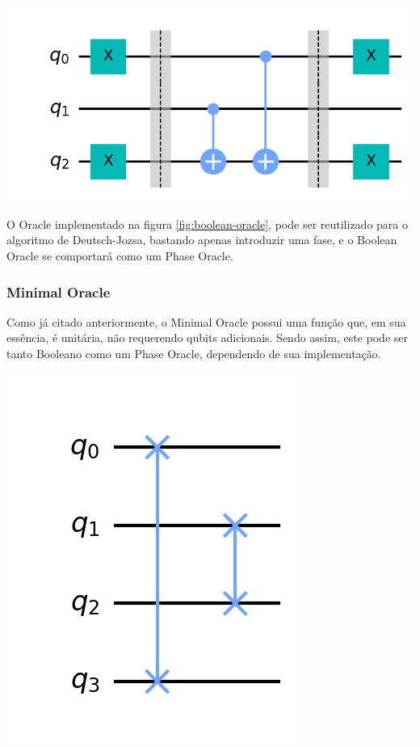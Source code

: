 \documentclass{article}
\begin{document}
\begin{center}
	\includegraphics[scale=0.3]{balanced-oracle.png}
	\label{fig:boolean-oracle}
\end{center}

O Oracle implementado na figura \ref{fig:boolean-oracle}, pode ser reutilizado para o algoritmo de Deutsch-Jozsa, bastando apenas introduzir uma fase, e o Boolean Oracle se comportará como um Phase Oracle.

\subsubsection{Minimal Oracle}
Como já citado anteriormente, o Minimal Oracle possui uma função que, em sua essência, é unitária, não requerendo qubits adicionais. Sendo assim, este pode ser tanto Booleano como um Phase Oracle, dependendo de sua implementação.

\begin{center}
	\includegraphics[scale=0.3]{minimal-oracle.png}
	\label{fig:minimal-oracle}
\end{center}
\end{document}
